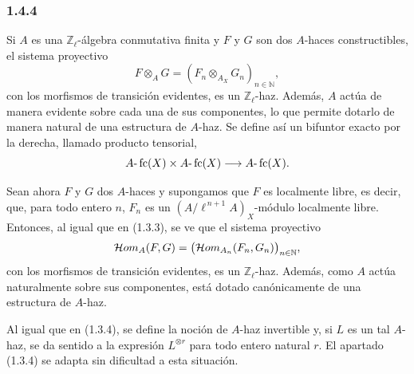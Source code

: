 \subsubsection*{1.4.4}
Si \(A\) es una \(\mathbb Z_\ell\)-álgebra conmutativa finita y \(F\) y \(G\) son dos \(A\)-haces constructibles, el sistema proyectivo
\[
F\otimes_A G=(F_n\otimes_{A_X} G_n)_{n\in\mathbb N},
\]
con los morfismos de transición evidentes, es un \(\mathbb Z_\ell\)-haz. Además, \(A\) actúa de manera evidente sobre cada una de sus componentes, lo que permite dotarlo de manera natural de una estructura de \(A\)-haz. Se define así un bifuntor exacto por la derecha, llamado producto tensorial,
\[
A\text{-}\operatorname{fc}(X)\times A\text{-}\operatorname{fc}(X)\longrightarrow A\text{-}\operatorname{fc}(X).
\]

Sean ahora \(F\) y \(G\) dos \(A\)-haces y supongamos que \(F\) es localmente libre, es decir, que, para todo entero \(n\), \(F_n\) es un \((A/\ell^{\,n+1}A)_X\)-módulo localmente libre. Entonces, al igual que en (1.3.3), se ve que el sistema proyectivo
\[
\mathcal{H}om_A(F,G)=\bigl(\mathcal{H}om_{A_n}(F_n,G_n)\bigr)_{n\in\mathbb N},
\]
con los morfismos de transición evidentes, es un \(\mathbb Z_\ell\)-haz. Además, como \(A\) actúa naturalmente sobre sus componentes, está dotado canónicamente de una estructura de \(A\)-haz.

Al igual que en (1.3.4), se define la noción de \(A\)-haz invertible y, si \(L\) es un tal \(A\)-haz, se da sentido a la expresión \(L^{\otimes r}\) para todo entero natural \(r\). El apartado (1.3.4) se adapta sin dificultad a esta situación.
